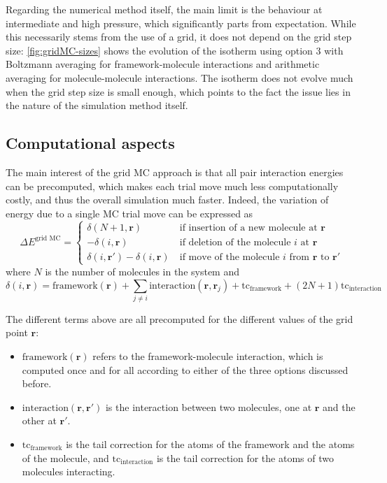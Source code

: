 \documentclass[main.tex]{subfiles}
\begin{document}
Regarding the numerical method itself, the main limit is the behaviour at intermediate and high pressure, which significantly parts from expectation. While this necessarily stems from the use of a grid, it does not depend on the grid step size: \cref{fig:gridMC-sizes} shows the evolution of the isotherm using option 3 with Boltzmann averaging for framework-molecule interactions and arithmetic averaging for molecule-molecule interactions. The isotherm does not evolve much when the grid step size is small enough, which points to the fact the issue lies in the nature of the simulation method itself.

\subsection{Computational aspects}

The main interest of the grid MC approach is that all pair interaction energies can be precomputed, which makes each trial move much less computationally costly, and thus the overall simulation much faster. Indeed, the variation of energy due to a single MC trial move can be expressed as
\[\Delta E^\text{grid MC} = \left\{\begin{split}
	\delta(N+1, \boldsymbol r)\ &\text{if insertion of a new molecule at }\boldsymbol r\\
	-\delta(i, \boldsymbol r)\ &\text{if deletion of the molecule }i\text{ at }\boldsymbol r\\
	\delta(i, \boldsymbol r') - \delta(i, \boldsymbol r)\ &\text{if move of the molecule }i\text{ from }\boldsymbol r\text{ to }\boldsymbol r'
\end{split}\right.\]
where $N$ is the number of molecules in the system and
\[\delta(i, \boldsymbol r) = \text{framework}(\boldsymbol r) + \sum_{j\neq i} \text{interaction}(\boldsymbol r, \boldsymbol r_j) + \text{tc}_\text{framework} + (2N+1)\text{tc}_\text{interaction}\]

The different terms above are all precomputed for the different values of the grid point $\boldsymbol r$:
\begin{itemize}
	\item $\text{framework}(\boldsymbol r)$ refers to the framework-molecule interaction, which is computed once and for all according to either of the three options discussed before.
	\item $\text{interaction}(\boldsymbol r, \boldsymbol r')$ is the interaction between two molecules, one at $\boldsymbol r$ and the other at $\boldsymbol r'$.
	\item $\text{tc}_\text{framework}$ is the tail correction for the atoms of the framework and the atoms of the molecule, and $\text{tc}_\text{interaction}$ is the tail correction for the atoms of two molecules interacting.
\end{itemize}
\end{document}
